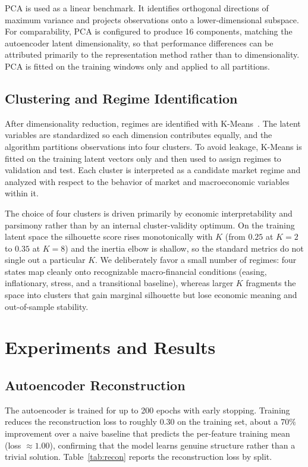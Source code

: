 \documentclass[conference]{IEEEtran}
\begin{document}
PCA is used as a linear benchmark. It identifies orthogonal directions of
maximum variance and projects observations onto a lower-dimensional subspace.
For comparability, PCA is configured to produce 16 components, matching the
autoencoder latent dimensionality, so that performance differences can be
attributed primarily to the representation method rather than to dimensionality.
PCA is fitted on the training windows only and applied to all partitions.

\subsection{Clustering and Regime Identification}
\label{sec:clustering}

After dimensionality reduction, regimes are identified with K-Means~\cite{lloyd1982least}. The latent
variables are standardized so each dimension contributes equally, and the
algorithm partitions observations into four clusters. To avoid leakage, K-Means
is fitted on the training latent vectors only and then used to assign regimes to
validation and test. Each cluster is interpreted as a candidate market regime
and analyzed with respect to the behavior of market and macroeconomic variables
within it.

The choice of four clusters is driven primarily by economic interpretability and
parsimony rather than by an internal cluster-validity optimum. On the training
latent space the silhouette score rises monotonically with $K$ (from $0.25$ at
$K=2$ to $0.35$ at $K=8$) and the inertia elbow is shallow, so the standard
metrics do not single out a particular $K$. We deliberately favor a small number
of regimes: four states map cleanly onto recognizable macro-financial conditions
(easing, inflationary, stress, and a transitional baseline), whereas larger $K$
fragments the space into clusters that gain marginal silhouette but lose economic
meaning and out-of-sample stability.

\section{Experiments and Results}

\subsection{Autoencoder Reconstruction}

The autoencoder is trained for up to 200 epochs with early stopping. Training
reduces the reconstruction loss to roughly $0.30$ on the training set, about a
$70\%$ improvement over a naive baseline that predicts the per-feature training
mean (loss $\approx 1.00$), confirming that the model learns genuine structure
rather than a trivial solution. Table~\ref{tab:recon} reports the reconstruction
loss by split.
\end{document}
